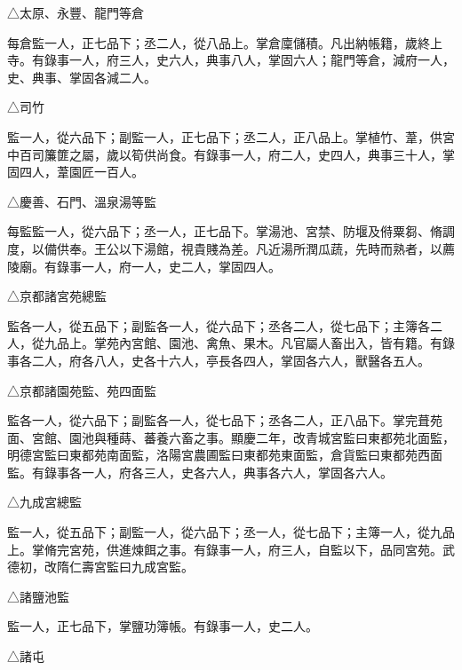 \begin{pinyinscope}
 △太原、永豐、龍門等倉



 每倉監一人，正七品下；丞二人，從八品上。掌倉廩儲積。凡出納帳籍，歲終上寺。有錄事一人，府三人，史六人，典事八人，掌固六人；龍門等倉，減府一人，史、典事、掌固各減二人。



 △司竹



 監一人，從六品下；副監一人，正七品下；丞二人，正八品上。掌植竹、葦，供宮中百司簾篚之屬，歲以筍供尚食。有錄事一人，府二人，史四人，典事三十人，掌固四人，葦園匠一百人。



 △慶善、石門、溫泉湯等監



 每監監一人，從六品下；丞一人，正七品下。掌湯池、宮禁、防堰及偫粟芻、脩調度，以備供奉。王公以下湯館，視貴賤為差。凡近湯所潤瓜蔬，先時而熟者，以薦陵廟。有錄事一人，府一人，史二人，掌固四人。



 △京都諸宮苑總監



 監各一人，從五品下；副監各一人，從六品下；丞各二人，從七品下；主簿各二人，從九品上。掌苑內宮館、園池、禽魚、果木。凡官屬人畜出入，皆有籍。有錄事各二人，府各八人，史各十六人，亭長各四人，掌固各六人，獸醫各五人。



 △京都諸園苑監、苑四面監



 監各一人，從六品下；副監各一人，從七品下；丞各二人，正八品下。掌完葺苑面、宮館、園池與種蒔、蕃養六畜之事。顯慶二年，改青城宮監曰東都苑北面監，明德宮監曰東都苑南面監，洛陽宮農圃監曰東都苑東面監，倉貨監曰東都苑西面監。有錄事各一人，府各三人，史各六人，典事各六人，掌固各六人。



 △九成宮總監



 監一人，從五品下；副監一人，從六品下；丞一人，從七品下；主簿一人，從九品上。掌脩完宮苑，供進煉餌之事。有錄事一人，府三人，自監以下，品同宮苑。武德初，改隋仁壽宮監曰九成宮監。



 △諸鹽池監



 監一人，正七品下，掌鹽功簿帳。有錄事一人，史二人。



 △諸屯




\end{pinyinscope}
